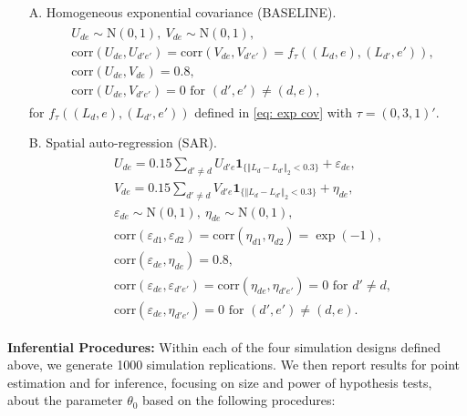 \documentclass[preprint]{imsart}
\numberwithin{equation}{section}
\theoremstyle{plain}
\theoremstyle{definition}
\renewcommand{\(}{\left(}
\renewcommand{\)}{\right)}
\renewcommand{\[}{\left[}
\renewcommand{\]}{\right]}
\begin{document}
\begin{itemize}
	\item[ A.] Homogeneous exponential covariance ({BASELINE}).  
	\begin{align} \begin{split}
		&U_{de}\sim \mathrm N(0,1),\  V_{de}\sim \mathrm N(0,1), \\
		&\mathrm{corr}(U_{de},U_{d'e'})=\mathrm{corr}(V_{de},V_{d'e'})=f_{\tau}( (L_d,e),(L_{d'},e')),\\
		&\mathrm{corr}(U_{de},V_{de})=0.8,\\
		& \mathrm{corr}(U_{de},V_{d'e'})=0\text{ for }(d',e')\ne (d,e),
	\end{split}\end{align}
	for $f_{\tau}( (L_d,e),(L_{d'},e'))$ defined in \eqref{eq: exp cov} with $\tau = (0,3,1)'$.
	\item[B.] Spatial auto-regression ({SAR}).
	\begin{align}\begin{split}
		& U_{de}=0.15  \textstyle \sum_{d'\ne d}U_{d'e} \textbf{1}_{\{ \Vert L_d-L_{d'}\Vert_2<0.3 \}} +\varepsilon_{de},\\
		&		V_{de}=0.15 \textstyle  \sum_{d'\ne d}V_{d'e} \textbf{1}_{\{ \Vert L_d-L_{d'}\Vert_2<0.3 \}} +\eta_{de},\\
		& \varepsilon_{de}\sim \mathrm N(0,1),\ \eta_{de}\sim \mathrm N(0,1),\\
		&\mathrm{corr}(\varepsilon_{d1},\varepsilon_{d2})=\mathrm{corr}(\eta_{d1},\eta_{d2})=\exp(-1),\\
		&\mathrm{corr}(\varepsilon_{de},\eta_{de})=0.8,\\
		& \mathrm{corr}(\varepsilon_{de},\varepsilon_{d'e'})=\mathrm{corr}(\eta_{de},\eta_{d'e'})=0\text{ for }d'\ne d,\\
		& \mathrm{corr}(\varepsilon_{de},\eta_{d'e'})=0 \text{ for }(d',e')\ne (d,e).
	\end{split}\end{align}
\end{itemize}


\noindent
\textbf{Inferential Procedures:} Within each of the four simulation designs defined above, we generate 1000 simulation replications. We then report results for point estimation and for inference, focusing on size and power of hypothesis tests, about the parameter $\theta_0$ based on the following procedures:
\end{document}
